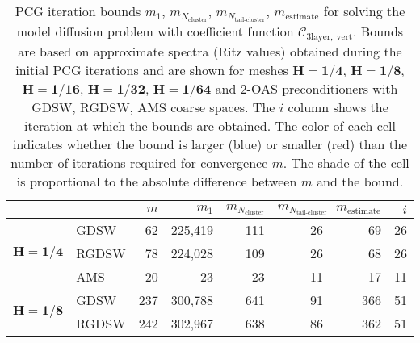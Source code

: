 \begin{table}[H]
\centering
\caption{PCG iteration bounds $m_1$, $m_{N_{\text{cluster}}}$, $m_{N_{\text{tail-cluster}}}$, $m_{\text{estimate}}$ for solving the model diffusion problem with coefficient function $\mathcal{C}_{\mathrm{3layer, \ vert}}$. Bounds are based on approximate spectra (Ritz values) obtained during the initial PCG iterations and are shown for meshes $\mathbf{H=1/4}$, $\mathbf{H=1/8}$, $\mathbf{H=1/16}$, $\mathbf{H=1/32}$, $\mathbf{H=1/64}$ and 2-OAS preconditioners with GDSW, RGDSW, AMS coarse spaces. The $i$ column shows the iteration at which the bounds are obtained. The color of each cell indicates whether the bound is larger (blue) or smaller (red) than the number of iterations required for convergence $m$. The shade of the cell is proportional to the absolute difference between $m$ and the bound.}
\label{tab:cg_iteration_bound_coef=3lvert}
\begin{tabular}{llrrrrrr}
\toprule
 &  & $m$ & $m_1$ & $m_{N_{\text{cluster}}}$ & $m_{N_{\text{tail-cluster}}}$ & $m_{\text{estimate}}$ & $i$ \\
\midrule
\multirow[c]{3}{*}{$\mathbf{H=1/4}$} & GDSW & 62 & {\cellcolor[HTML]{C1D2F8}} \color[HTML]{000000} 225,419 & {\cellcolor[HTML]{9FC0F4}} \color[HTML]{000000} 111 & {\cellcolor[HTML]{945357}} \color[HTML]{F1F1F1} 26 & {\cellcolor[HTML]{7EAFF1}} \color[HTML]{000000} 69 & 26 \\
\cline{2-8}
 & RGDSW & 78 & {\cellcolor[HTML]{AFC9F6}} \color[HTML]{000000} 224,028 & {\cellcolor[HTML]{7EAFF1}} \color[HTML]{000000} 109 & {\cellcolor[HTML]{BB9CA9}} \color[HTML]{F1F1F1} 26 & {\cellcolor[HTML]{945357}} \color[HTML]{F1F1F1} 68 & 26 \\
\cline{2-8}
 & AMS & 20 & {\cellcolor[HTML]{7EAFF1}} \color[HTML]{000000} 23 & {\cellcolor[HTML]{7EAFF1}} \color[HTML]{000000} 23 & {\cellcolor[HTML]{BB9CA9}} \color[HTML]{F1F1F1} 11 & {\cellcolor[HTML]{945357}} \color[HTML]{F1F1F1} 17 & 11 \\
\cline{1-8} \cline{2-8}
\multirow[c]{3}{*}{$\mathbf{H=1/8}$} & GDSW & 237 & {\cellcolor[HTML]{C1D2F8}} \color[HTML]{000000} 300,788 & {\cellcolor[HTML]{9FC0F4}} \color[HTML]{000000} 641 & {\cellcolor[HTML]{945357}} \color[HTML]{F1F1F1} 91 & {\cellcolor[HTML]{7EAFF1}} \color[HTML]{000000} 366 & 51 \\
\cline{2-8}
 & RGDSW & 242 & {\cellcolor[HTML]{C1D2F8}} \color[HTML]{000000} 302,967 & {\cellcolor[HTML]{9FC0F4}} \color[HTML]{000000} 638 & {\cellcolor[HTML]{945357}} \color[HTML]{F1F1F1} 86 & {\cellcolor[HTML]{7EAFF1}} \color[HTML]{000000} 362 & 51 \\

\end{tabular}
\end{table}
